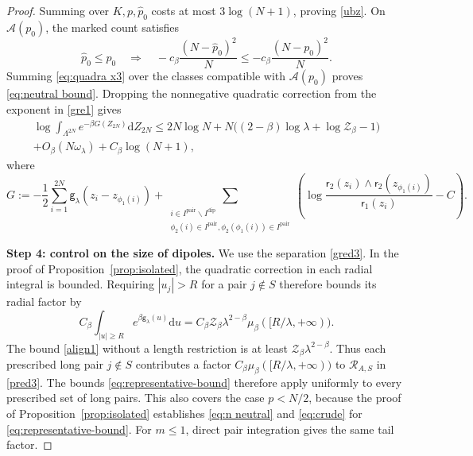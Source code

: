 \documentclass[a4paper,10pt,leqno]{amsart}
\numberwithin{equation}{section}
\newcommand{\dd}{\mathrm{d}}
\def\hal{\frac{1}{2}}
\def\mc{\mathcal}
\def\g{\mathsf{g}}
\def\rr{\mathsf{r}}
\newcommand{\dip}{\mathrm{dip}}
\def\pair{\mathrm{pair}}
\begin{document}
\begin{proof}
  Summing over $K,p,\widehat p_0$ costs at most $3\log(N+1)$, proving \eqref{ubz}. On $\mc A(p_0)$, the marked count satisfies
  \[
    \widehat p_0\le p_0\quad\Longrightarrow\quad
    -c_\beta\frac{(N-\widehat p_0)^2}{N}
    \le-c_\beta\frac{(N-p_0)^2}{N}.
  \]
  Summing \eqref{eq:quadra x3} over the classes compatible with $\mc A(p_0)$ proves \eqref{eq:neutral bound}. Dropping the nonnegative quadratic correction from the exponent in \eqref{gre1} gives
  \begin{multline}\label{eq:alt}
    \log\int_{\Lambda^{2N}} e^{-\beta G(Z_{2N})} \dd Z_{2N}\le2N\log N
    +N\bigl((2-\beta)\log\lambda+\log\mc{Z}_\beta-1\bigr)\\
    +O_\beta(N\omega_\lambda)+C_\beta\log(N+1),
  \end{multline}
  where
  \begin{equation*}
    G:=-\hal \sum_{ i=1}^{2N} \g_\lambda(z_i-z_{\phi_1(i)} )+ \sum_{\substack{i\in I^{\pair}\backslash I^{\dip}\\ \phi_2(i) \in I^\pair, \phi_2(\phi_1(i)) \in I^\pair}}\left( \log
    \frac{\rr_2(z_i) \wedge \rr_2(z_{\phi_1(i)})}{\rr_1(z_i)}-C\right).
  \end{equation*}

  \medskip

  \noindent
  \textbf{Step 4: control on the size of dipoles.}
  We use the separation \eqref{gred3}. In the proof of Proposition~\ref{prop:isolated}, the quadratic correction in each radial integral is bounded. Requiring $|u_j|>R$ for a pair $j\notin S$ therefore bounds its radial factor by
  \[
    C_\beta\int_{|u|\ge R}e^{\beta\g_\lambda(u)}\dd u
    =C_\beta\mc Z_\beta\lambda^{2-\beta}\mu_\beta([R/\lambda,+\infty)).
  \]
  The bound \eqref{align1} without a length restriction is at least $\mc Z_\beta\lambda^{2-\beta}$. Thus each prescribed long pair $j\notin S$ contributes a factor $C_\beta\mu_\beta([R/\lambda,+\infty))$ to $\mathcal R_{A,S}$ in \eqref{pred3}. The bounds \eqref{eq:representative-bound} therefore apply uniformly to every prescribed set of long pairs. This also covers the case $p<N/2$, because the proof of Proposition~\ref{prop:isolated} establishes \eqref{eq:n neutral} and \eqref{eq:crude} for \eqref{eq:representative-bound}. For $m\le1$, direct pair integration gives the same tail factor.


\end{proof}
\end{document}
